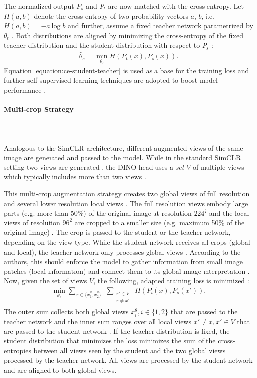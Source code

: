\par
The normalized output $P_s$ and $P_t$ are now matched with the cross-entropy.
Let $H(a,b)$ denote the cross-entropy of two probability vectors $a$, $b$, i.e. $H(a,b)=-a \log b$ and further, assume a fixed teacher network parametrized by $\theta_t$ \citep{Caron2021}.
Both distributions are aligned by minimizing the cross-entropy of the fixed teacher distribution and the student distribution with respect to $P_s$ \citep{Caron2021}: 
\begin{align}
	\hat{\theta}_s = \min_{\theta_s}H(P_t(x),P_s(x)).
	\label{equation:ce-student-teacher}	
\end{align}
Equation \ref{equation:ce-student-teacher} is used as a base for the training loss and further self-supervised learning techniques are adopted to boost model performance \citep{Caron2021}.
\paragraph{Multi-crop Strategy} \mbox{} \\
\\
Analogous to the SimCLR architecture, different augmented views of the same image are generated and passed to the model.
While in the standard SimCLR setting two views are generated \citep{Chen2020}, the DINO head uses a \textit{set} $V$ of multiple views which typically includes more than two views \citep{Caron2021}.
\par
This multi-crop augmentation strategy creates two global views of full resolution and several lower resolution local views \citep{Caron2020, Caron2021}. 
The full resolution views embody large parts (e.g. more than 50\%) of the original image at resolution $224^2$ and the local views of resolution $96^2$ are cropped to a smaller size (e.g. maximum 50\% of the original image) \citep{Caron2021}.
The crop is passed to the student or the teacher network, depending on the view type.
While the student network receives all crops (global and local), the teacher network only processes global views \citep{Caron2021}.
According to the authors, this should enforce the model to gather information from small image patches (local information) and connect them to its global image interpretation \citep{Caron2021}.
Now, given the set of views $V$, the following, adapted training loss is minimized \citep{Caron2021}:
\begin{align}
	\min_{\theta_s}\sum_{x \in \{x_1^g, x_2^g\}} \hspace{5pt} \sum_{\substack{ x' \in V, \\ x\neq x'}} H(P_t(x),P_s(x')).
	\label{equation:dino-training-objective}
\end{align}
The outer sum collects both global views $x_i^g, i\in\{1,2\}$ that are passed to the teacher network and the inner sum ranges over all local views $x' \neq x, x' \in V $ that are passed to the student network \citep{Caron2021}.
If the teacher distribution is fixed, the student distribution that minimizes the loss minimizes the sum of the cross-entropies between all views seen by the student and the two global views processed by the teacher network.
All views are processed by the student network and are aligned to both global views.
